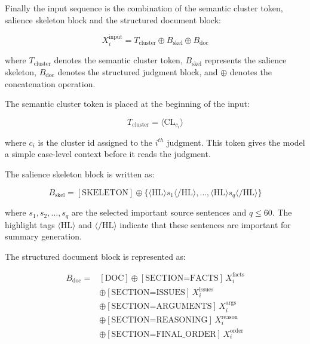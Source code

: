 \documentclass[11pt, a4paper]{article}
\theoremstyle{plain}%
\theoremstyle{remark}%
\theoremstyle{definition}%
\begin{document}
Finally the input sequence is the combination of the semantic cluster token, salience skeleton block and the structured document block:

\begin{equation}
X_i^{\text{input}} =
T_{\text{cluster}} \oplus B_{\text{skel}} \oplus B_{\text{doc}}
\end{equation}

where $T_{\text{cluster}}$ denotes the semantic cluster token, $B_{\text{skel}}$ represents the salience skeleton, $B_{\text{doc}}$ denotes the structured judgment block, and \(\oplus\) denotes the concatenation operation.

The semantic cluster token is placed at the beginning of the input:

\begin{equation}
T_{\text{cluster}} = \langle \mathrm{CL}_{c_i} \rangle
\end{equation}

where \(c_i\) is the cluster id assigned to the \(i^{th}\) judgment. This token gives the model a simple case-level context before it reads the judgment.

The salience skeleton block is written as:

\begin{equation}
B_{\text{skel}} =
[\text{SKELETON}] \oplus
\{
\langle \mathrm{HL} \rangle s_1 \langle /\mathrm{HL} \rangle,
\ldots,
\langle \mathrm{HL} \rangle s_q \langle /\mathrm{HL} \rangle
\}
\end{equation}

where \(s_1, s_2, \ldots, s_q\) are the selected important source sentences and \(q \leq 60\). The highlight tags \(\langle \mathrm{HL} \rangle\) and \(\langle /\mathrm{HL} \rangle\) indicate that these sentences are important for summary generation.

The structured document block is represented as:

\begin{equation}
\begin{aligned}
B_{\text{doc}} ={}& [\text{DOC}] \oplus [\text{SECTION=FACTS}]\,X_i^{\text{facts}} \\
&\oplus [\text{SECTION=ISSUES}]\,X_i^{\text{issues}} \\
&\oplus [\text{SECTION=ARGUMENTS}]\,X_i^{\text{args}} \\
&\oplus [\text{SECTION=REASONING}]\,X_i^{\text{reason}} \\
&\oplus [\text{SECTION=FINAL\_ORDER}]\,X_i^{\text{order}}
\end{aligned}
\end{equation}
\end{document}
